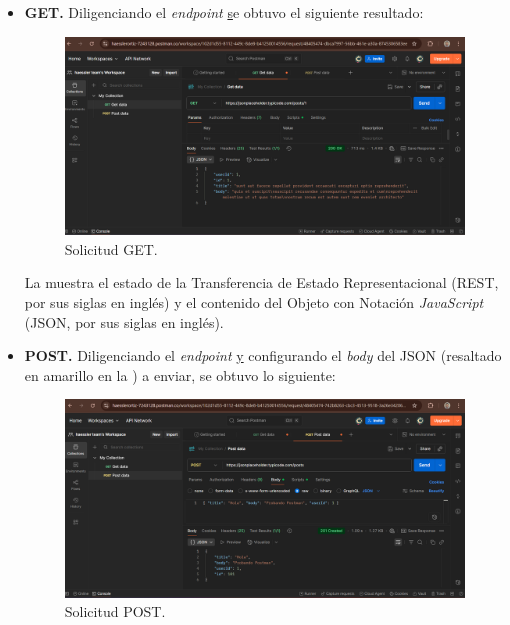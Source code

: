 \documentclass[12pt,a4paper]{article}
\begin{document}
\begin{itemize}
  \item \textbf{GET.}
  Diligenciando el \textit{endpoint} \href{https://jsonplaceholder.typicode.com/posts/1} se obtuvo el siguiente resultado:

  \begin{figure}[H]
    \centering
    \includegraphics[width=\textwidth]{get.png}
    \caption{Solicitud GET.}
    \label{fig:get}
  \end{figure}

  La  muestra el estado de la Transferencia de Estado Representacional (REST, por sus siglas en inglés) y el 
  contenido del Objeto con Notación \textit{JavaScript} (JSON, por sus siglas en inglés).
 
  \item \textbf{POST.}
  Diligenciando el \textit{endpoint} \href{https://jsonplaceholder.typicode.com/posts} y configurando el \textit{body} del 
  JSON (resaltado en amarillo en la ) a enviar, se obtuvo lo siguiente:

  \begin{figure}[H]
    \centering
    \includegraphics[width=\textwidth]{post.png}
    \caption{Solicitud POST.}
    \label{fig:post}
  \end{figure}


\end{itemize}
\end{document}
